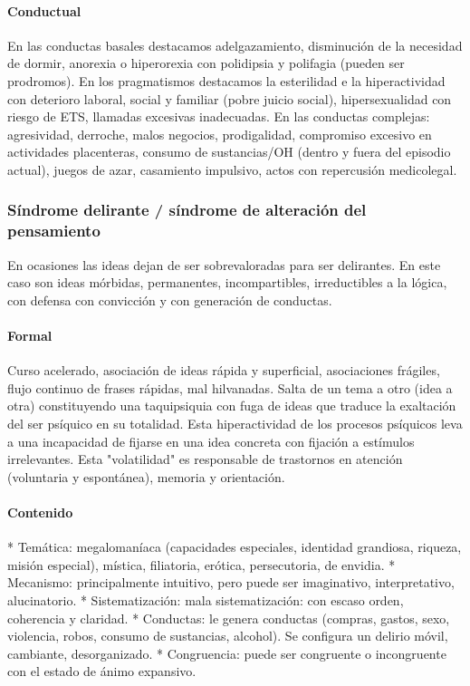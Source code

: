 \paragraph{Conductual}
En las conductas basales destacamos adelgazamiento, disminución de la necesidad de dormir, anorexia o hiperorexia con polidipsia y polifagia (pueden ser prodromos). En los pragmatismos destacamos la esterilidad e la hiperactividad con deterioro laboral, social y familiar (pobre juicio social), hipersexualidad con riesgo de ETS, llamadas excesivas inadecuadas. En las conductas complejas: agresividad, derroche, malos negocios, prodigalidad, compromiso excesivo en actividades placenteras, consumo de sustancias/OH (dentro y fuera del episodio actual), juegos de azar, casamiento impulsivo, actos con repercusión medicolegal.
\subsubsection*{Síndrome delirante / síndrome de alteración del pensamiento}
En ocasiones las ideas dejan de ser sobrevaloradas para ser delirantes. En este caso son ideas mórbidas, permanentes, incompartibles, irreductibles a la lógica, con defensa con convicción y con generación de conductas.
\paragraph{Formal}
Curso acelerado, asociación de ideas rápida y superficial, asociaciones frágiles, flujo continuo de frases rápidas, mal hilvanadas. Salta de un tema a otro (idea a otra) constituyendo una taquipsiquia con fuga de ideas que traduce la exaltación del ser psíquico en su totalidad. Esta hiperactividad de los procesos psíquicos leva a una incapacidad de fijarse en una idea concreta con fijación a estímulos irrelevantes. Esta "volatilidad" es responsable de trastornos en atención (voluntaria y espontánea), memoria y orientación.
\paragraph{Contenido}
* Temática: megalomaníaca (capacidades especiales, identidad grandiosa, riqueza, misión especial), mística, filiatoria, erótica, persecutoria, de envidia.
* Mecanismo: principalmente intuitivo, pero puede ser imaginativo, interpretativo, alucinatorio.
* Sistematización: mala sistematización: con escaso orden, coherencia y claridad.
* Conductas: le genera conductas (compras, gastos, sexo, violencia, robos, consumo de sustancias, alcohol). Se configura un delirio móvil, cambiante, desorganizado.
* Congruencia: puede ser congruente o incongruente con el estado de ánimo expansivo.
